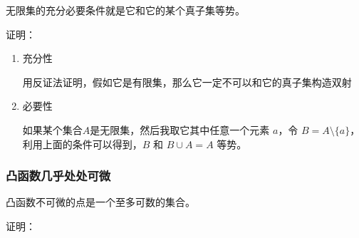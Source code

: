\documentclass[12pt,a4paper]{ctexart}
\begin{document}
无限集的充分必要条件就是它和它的某个真子集等势。

证明：

\begin{enumerate}
    \item 充分性

    用反证法证明，假如它是有限集，那么它一定不可以和它的真子集构造双射

    \item 必要性

    如果某个集合$A$是无限集，然后我取它其中任意一个元素 $a$，令 $B = A \setminus \{ a \}$，利用上面的条件可以得到，$B$ 和 $B \cup A = A$ 等势。
\end{enumerate}

\subsubsection{凸函数几乎处处可微}

凸函数不可微的点是一个至多可数的集合。

证明：
\end{document}
